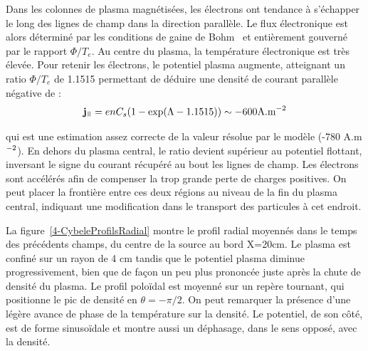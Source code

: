 \begin{refsection}
Dans les colonnes de plasma magnétisées, les électrons ont tendance à s'échapper
le long des lignes de champ dans la direction parallèle. Le flux électronique
est alors déterminé par les conditions de gaine de Bohm~\parencite{Stangeby} et
entièrement gouverné par le rapport $\Phi/T_e$. Au centre du plasma, la
température électronique est très élevée. Pour retenir les électrons, le
potentiel plasma augmente, atteignant un ratio $\Phi/T_e$ de 1.1515 permettant
de déduire une densité de courant parallèle négative de :
\begin{equation}
\mathbf j_\para=enC_s(1-\exp(\Lambda-1.1515))\sim -600\text{A.m}\puissance{-2}
\end{equation}

qui est une estimation assez correcte de la valeur résolue par le modèle (-780
A.m$^{{-2}}$). En dehors du plasma central, le ratio devient supérieur
au potentiel flottant, inversant le signe du courant récupéré au bout les lignes
de champ. Les électrons sont accélérés afin de compenser la trop grande perte de
charges positives. On peut placer la frontière entre ces deux régions au niveau
de la fin du plasma central, indiquant une modification dans le transport des
particules à cet endroit.

La figure~\ref{4-CybeleProfilsRadial} montre le profil radial moyennés dans le
temps des précédents champs, du centre de la source au bord X=20cm. Le plasma
est confiné sur un rayon de 4 cm tandis que le potentiel plasma
diminue progressivement, bien que de façon un peu plus prononcée juste après la
chute de densité du plasma. 
Le profil poloïdal est moyenné sur un repère tournant, qui positionne le pic de
densité en $\theta=-\pi/2$. On peut remarquer la présence d'une légère avance de
phase de la température sur la densité. Le potentiel, de son côté, est de forme
sinusoïdale et montre aussi un déphasage, dans le sens opposé, avec la densité.


\end{refsection}
